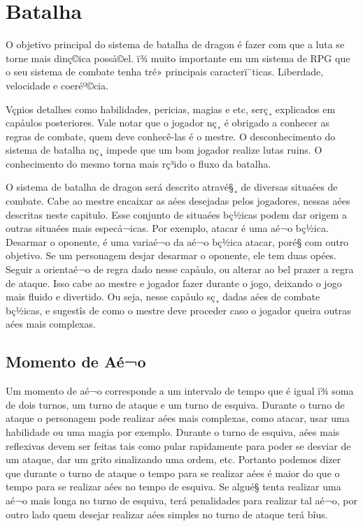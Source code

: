 
\chapter{Batalha}
\label{Cap:batalha}

O objetivo principal do sistema de batalha de dragon é fazer com que a luta se torne mais dinç©ica posså©el. ï¾ muito importante em um sistema de RPG que o seu sistema de combate tenha tré» principais caracterï¨ticas. Liberdade, velocidade e coeréº©cia. 
	 
Vçµios detalhes como habilidades, pericias, magias e etc, serç¸ explicados em capåulos posteriores. Vale notar que o jogador nç¸ é obrigado a conhecer as regras de combate, quem deve conhecê-las é o mestre. O desconhecimento do sistema de batalha nç¸ impede que um bom jogador realize lutas ruins. O conhecimento do mesmo torna mais rç³ido o fluxo da batalha.

O sistema de batalha de dragon será descrito atravé§¸ de diversas situaées de combate. Cabe ao mestre encaixar as aées desejadas pelos jogadores, nessas aées descritas neste capitulo. Esse conjunto de situaées bç½icas podem dar origem a outras situaées mais especå¬icas. Por exemplo, atacar é uma aé¬o bç½ica. Desarmar o oponente, é uma variaé¬o da aé¬o bç½ica atacar, poré§ com outro objetivo. Se um personagem desjar desarmar o oponente, ele tem duas opées. Seguir a orientaé¬o de regra dado nesse capåulo, ou alterar ao bel prazer a regra de ataque. Isso cabe ao mestre e jogador fazer durante o jogo, deixando o jogo mais fluido e divertido. Ou seja, nesse capåulo sç¸ dadas aées de combate bç½icas, e sugestîs de como o mestre deve proceder caso o jogador queira outras aées mais complexas.

\section{Momento de Aé¬o}

Um momento de aé¬o corresponde a um intervalo de tempo que é igual ï¾ soma de dois turnos, um turno de ataque e um turno de esquiva. Durante o turno de ataque o personagem pode realizar aées mais complexas, como atacar, usar uma habilidade ou uma magia por exemplo. Durante o turno de esquiva, aées mais reflexivas devem ser feitas tais como pular rapidamente para poder se desviar de um ataque, dar um grito sinalizando uma ordem, etc. Portanto podemos dizer que durante o turno de ataque o tempo para se realizar aées é maior do que o tempo para se realizar aées no tempo de esquiva. Se algué§ tenta realizar uma aé¬o mais longa no turno de esquiva, terá penalidades para realizar tal aé¬o, por outro lado quem desejar realizar aées simples no turno de ataque terá bîus.
	
